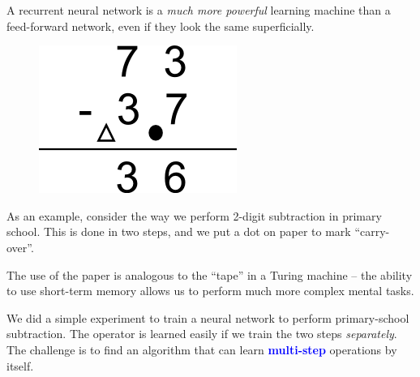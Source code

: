 \documentclass[orivec]{llncs}
\newcommand{\emp}[1]{\textbf{\textcolor{blue}{#1}}}
\begin{document}
\begin{tcolorbox}[width=\textwidth,colback={white},title={\centering \emp{Example 1: } primary-school arithmetic},colbacktitle=white,coltitle=black]

A recurrent neural network is a \textit{much more powerful} learning machine than a feed-forward network, even if they look the same superficially.

\begin{figure}
\includegraphics[scale=0.6]{elementary-arithmetic.png}
\end{figure} 

As an example, consider the way we perform 2-digit subtraction in primary school.  This is done in two steps, and we put a dot on paper to mark ``carry-over''.

The use of the paper is analogous to the ``tape'' in a Turing machine -- the ability to use short-term memory allows us to perform much more complex mental tasks.

We did a simple experiment to train a neural network to perform primary-school subtraction.  The operator is learned easily if we train the two steps \textit{separately}.  The challenge is to find an algorithm that can learn \emp{multi-step} operations by itself.

\end{tcolorbox}
\end{document}

